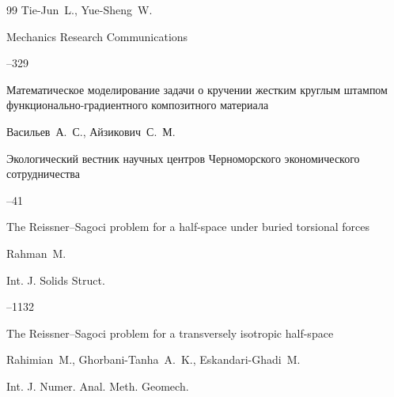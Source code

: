 \begin{thebibliography}{99}
\by Tie-Jun~L., Yue-Sheng~W. 

\jour Mechanics Research Communications 




--329






\paper Математическое моделирование задачи о кручении жестким круглым штампом функционально-градиентного композитного материала

\by Васильев~А.~С., Айзикович~С.~М. 

\jour Экологический вестник научных центров Черноморского экономического сотрудничества 



--41









\paper The Reissner--Sagoci problem for a half-space under buried torsional forces 

\by Rahman~M. 

\jour Int. J. Solids Struct. 




--1132






\paper The Reissner--Sagoci problem for a transversely isotropic half-space

\by Rahimian~M., Ghorbani-Tanha~A.~K., Eskandari-Ghadi~M. 

\jour Int. J. Numer. Anal. Meth. Geomech. 





\end{thebibliography}
